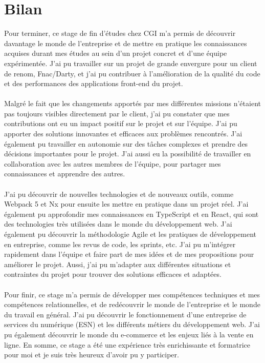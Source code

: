 \documentclass[12pt, a4paper]{report}
\begin{document}
	\chapter{Bilan}
	
	Pour terminer, ce stage de fin d'études chez CGI m'a permis de découvrir davantage le monde de l'entreprise et de mettre en pratique les connaissances acquises durant mes études au sein d'un projet concret et d'une équipe expérimentée. J'ai pu travailler sur un projet de grande envergure pour un client de renom, Fnac/Darty, et j'ai pu contribuer à l'amélioration de la qualité du code et des performances des applications front-end du projet.
	\\\\
	Malgré le fait que les changements apportés par mes différentes missions n'étaient pas toujours visibles directement par le client, j'ai pu constater que mes contributions ont eu un impact positif sur le projet et sur l'équipe. J'ai pu apporter des solutions innovantes et efficaces aux problèmes rencontrés. J'ai également pu travailler en autonomie sur des tâches complexes et prendre des décisions importantes pour le projet. J'ai aussi eu la possibilité de travailler en collaboration avec les autres membres de l'équipe, pour partager mes connaissances et apprendre des autres.
	\\\\
	J'ai pu découvrir de nouvelles technologies et de nouveaux outils, comme Webpack 5 et Nx pour ensuite les mettre en pratique dans un projet réel. J'ai également pu approfondir mes connaissances en TypeScript et en React, qui sont des technologies très utilisées dans le monde du développement web. J'ai également pu découvrir la méthodologie Agile et les pratiques de développement en entreprise, comme les revus de code, les sprints, etc. J'ai pu m'intégrer rapidement dans l'équipe et faire part de mes idées et de mes propositions pour améliorer le projet. Aussi, j'ai pu m'adapter aux différentes situations et contraintes du projet pour trouver des solutions efficaces et adaptées. 
	\\\\
	Pour finir, ce stage m'a permis de développer mes compétences techniques et mes compétences relationnelles, et de redécouvrir le monde de l'entreprise et le monde du travail en général. J'ai pu découvrir le fonctionnement d'une entreprise de services du numérique (ESN) et les différents métiers du développement web. J'ai pu également découvrir le monde du e-commerce et les enjeux liés à la vente en ligne. En somme, ce stage a été une expérience très enrichissante et formatrice pour moi et je suis très heureux d'avoir pu y participer.
\end{document}

